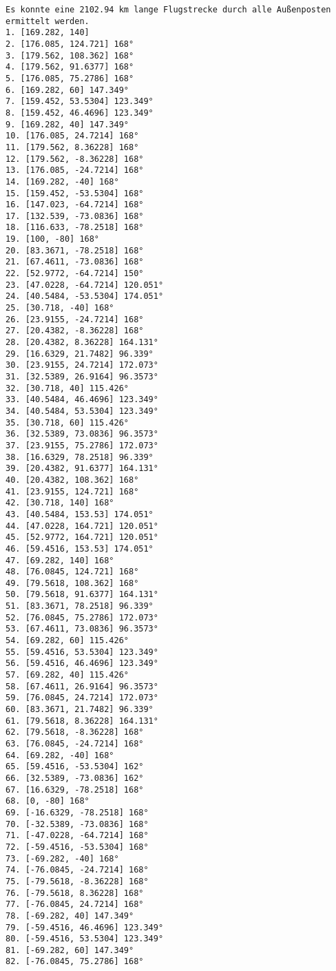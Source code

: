 \documentclass[a4paper,10pt,ngerman]{scrartcl}
\begin{document}
    \begin{lstlisting}[frame=single, title=Programmausgabe wenigerkrumm3.txt, breaklines=true,label={lst:lstlisting4}]
Es konnte eine 2102.94 km lange Flugstrecke durch alle Außenposten ermittelt werden.
1. [169.282, 140]
2. [176.085, 124.721] 168°
3. [179.562, 108.362] 168°
4. [179.562, 91.6377] 168°
5. [176.085, 75.2786] 168°
6. [169.282, 60] 147.349°
7. [159.452, 53.5304] 123.349°
8. [159.452, 46.4696] 123.349°
9. [169.282, 40] 147.349°
10. [176.085, 24.7214] 168°
11. [179.562, 8.36228] 168°
12. [179.562, -8.36228] 168°
13. [176.085, -24.7214] 168°
14. [169.282, -40] 168°
15. [159.452, -53.5304] 168°
16. [147.023, -64.7214] 168°
17. [132.539, -73.0836] 168°
18. [116.633, -78.2518] 168°
19. [100, -80] 168°
20. [83.3671, -78.2518] 168°
21. [67.4611, -73.0836] 168°
22. [52.9772, -64.7214] 150°
23. [47.0228, -64.7214] 120.051°
24. [40.5484, -53.5304] 174.051°
25. [30.718, -40] 168°
26. [23.9155, -24.7214] 168°
27. [20.4382, -8.36228] 168°
28. [20.4382, 8.36228] 164.131°
29. [16.6329, 21.7482] 96.339°
30. [23.9155, 24.7214] 172.073°
31. [32.5389, 26.9164] 96.3573°
32. [30.718, 40] 115.426°
33. [40.5484, 46.4696] 123.349°
34. [40.5484, 53.5304] 123.349°
35. [30.718, 60] 115.426°
36. [32.5389, 73.0836] 96.3573°
37. [23.9155, 75.2786] 172.073°
38. [16.6329, 78.2518] 96.339°
39. [20.4382, 91.6377] 164.131°
40. [20.4382, 108.362] 168°
41. [23.9155, 124.721] 168°
42. [30.718, 140] 168°
43. [40.5484, 153.53] 174.051°
44. [47.0228, 164.721] 120.051°
45. [52.9772, 164.721] 120.051°
46. [59.4516, 153.53] 174.051°
47. [69.282, 140] 168°
48. [76.0845, 124.721] 168°
49. [79.5618, 108.362] 168°
50. [79.5618, 91.6377] 164.131°
51. [83.3671, 78.2518] 96.339°
52. [76.0845, 75.2786] 172.073°
53. [67.4611, 73.0836] 96.3573°
54. [69.282, 60] 115.426°
55. [59.4516, 53.5304] 123.349°
56. [59.4516, 46.4696] 123.349°
57. [69.282, 40] 115.426°
58. [67.4611, 26.9164] 96.3573°
59. [76.0845, 24.7214] 172.073°
60. [83.3671, 21.7482] 96.339°
61. [79.5618, 8.36228] 164.131°
62. [79.5618, -8.36228] 168°
63. [76.0845, -24.7214] 168°
64. [69.282, -40] 168°
65. [59.4516, -53.5304] 162°
66. [32.5389, -73.0836] 162°
67. [16.6329, -78.2518] 168°
68. [0, -80] 168°
69. [-16.6329, -78.2518] 168°
70. [-32.5389, -73.0836] 168°
71. [-47.0228, -64.7214] 168°
72. [-59.4516, -53.5304] 168°
73. [-69.282, -40] 168°
74. [-76.0845, -24.7214] 168°
75. [-79.5618, -8.36228] 168°
76. [-79.5618, 8.36228] 168°
77. [-76.0845, 24.7214] 168°
78. [-69.282, 40] 147.349°
79. [-59.4516, 46.4696] 123.349°
80. [-59.4516, 53.5304] 123.349°
81. [-69.282, 60] 147.349°
82. [-76.0845, 75.2786] 168°

\end{lstlisting}
\end{document}

